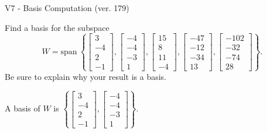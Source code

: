 \begin{exercise}
  \begin{exerciseTitle}V7 - Basis Computation (ver. 179)\end{exerciseTitle}
  \begin{exerciseStatement}
    Find a basis for the subspace 
\[W=\mathrm{span}\ \left\{\left[\begin{array}{r}
3 \\
-4 \\
2 \\
-1
\end{array}\right] , \left[\begin{array}{r}
-4 \\
-4 \\
-3 \\
1
\end{array}\right] , \left[\begin{array}{r}
15 \\
8 \\
11 \\
-4
\end{array}\right] , \left[\begin{array}{r}
-47 \\
-12 \\
-34 \\
13
\end{array}\right] , \left[\begin{array}{r}
-102 \\
-32 \\
-74 \\
28
\end{array}\right]\right\}.\]
 Be sure to explain why your result is a basis.


  \end{exerciseStatement}
  \begin{exerciseAnswer}
   A basis of \(W\) is  \(\left\{\left[\begin{array}{r}
3 \\
-4 \\
2 \\
-1
\end{array}\right] , \left[\begin{array}{r}
-4 \\
-4 \\
-3 \\
1
\end{array}\right]\right\}\).
  


  \end{exerciseAnswer}
\end{exercise}